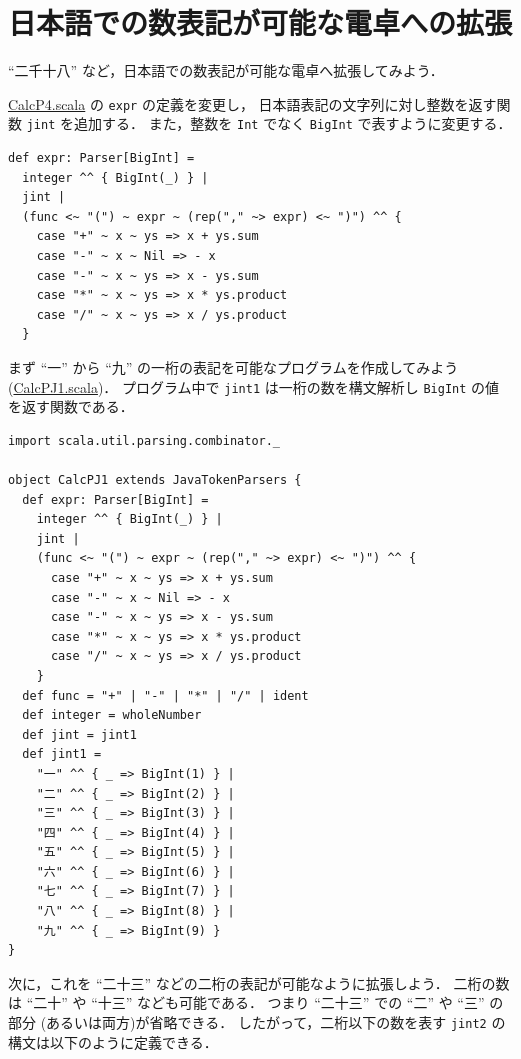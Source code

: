 \documentclass[a4j]{jsarticle}
\begin{document}
\section{日本語での数表記が可能な電卓への拡張}
\label{sec-6}

``二千十八'' など，日本語での数表記が可能な電卓へ拡張してみよう．

\href{file:///home/tamura/lect2/ProLang/2018/org/prog/parser/CalcP4.scala}{CalcP4.scala} の \texttt{expr} の定義を変更し，
日本語表記の文字列に対し整数を返す関数 \texttt{jint} を追加する．
また，整数を \texttt{Int} でなく \texttt{BigInt} で表すように変更する．


\begin{verbatim}
def expr: Parser[BigInt] =
  integer ^^ { BigInt(_) } |
  jint |
  (func <~ "(") ~ expr ~ (rep("," ~> expr) <~ ")") ^^ {
    case "+" ~ x ~ ys => x + ys.sum
    case "-" ~ x ~ Nil => - x
    case "-" ~ x ~ ys => x - ys.sum
    case "*" ~ x ~ ys => x * ys.product
    case "/" ~ x ~ ys => x / ys.product
  }
\end{verbatim}

まず ``一'' から ``九'' の一桁の表記を可能なプログラムを作成してみよう
(\href{file:///home/tamura/lect2/ProLang/2018/org/prog/parser/CalcPJ1.scala}{CalcPJ1.scala})．
プログラム中で \texttt{jint1} は一桁の数を構文解析し \texttt{BigInt} の値を返す関数である．


\begin{verbatim}
import scala.util.parsing.combinator._

object CalcPJ1 extends JavaTokenParsers {
  def expr: Parser[BigInt] =
    integer ^^ { BigInt(_) } |
    jint |
    (func <~ "(") ~ expr ~ (rep("," ~> expr) <~ ")") ^^ {
      case "+" ~ x ~ ys => x + ys.sum
      case "-" ~ x ~ Nil => - x
      case "-" ~ x ~ ys => x - ys.sum
      case "*" ~ x ~ ys => x * ys.product
      case "/" ~ x ~ ys => x / ys.product
    }
  def func = "+" | "-" | "*" | "/" | ident
  def integer = wholeNumber
  def jint = jint1
  def jint1 =
    "一" ^^ { _ => BigInt(1) } |
    "二" ^^ { _ => BigInt(2) } |
    "三" ^^ { _ => BigInt(3) } |
    "四" ^^ { _ => BigInt(4) } |
    "五" ^^ { _ => BigInt(5) } |
    "六" ^^ { _ => BigInt(6) } |
    "七" ^^ { _ => BigInt(7) } |
    "八" ^^ { _ => BigInt(8) } |
    "九" ^^ { _ => BigInt(9) }
}
\end{verbatim}

次に，これを ``二十三'' などの二桁の表記が可能なように拡張しよう．
二桁の数は ``二十'' や ``十三'' なども可能である．
つまり ``二十三'' での ``二'' や ``三'' の部分 (あるいは両方)が省略できる．
したがって，二桁以下の数を表す \texttt{jint2} の構文は以下のように定義できる．
\end{document}
